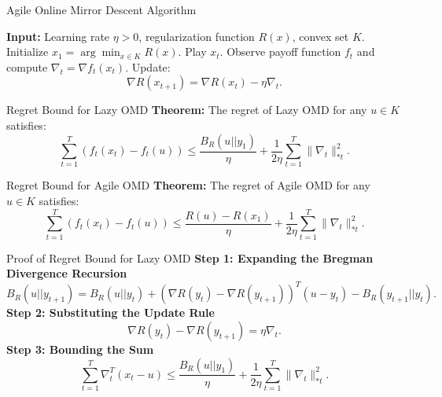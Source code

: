 \documentclass{beamer}
\begin{document}
\begin{frame}{Agile Online Mirror Descent Algorithm}
    \begin{algorithm}[H]
        \caption{Agile Online Mirror Descent}
        \begin{algorithmic}[1]
            \State \textbf{Input:} Learning rate $\eta > 0$, regularization function $R(x)$, convex set $K$.
            \State Initialize $x_1 = \arg\min_{x \in K} R(x)$.
                \State Play $x_t$.
                \State Observe payoff function $f_t$ and compute $\nabla_t = \nabla f_t(x_t)$.
                \State Update:
                \begin{equation}
                    \nabla R(x_{t+1}) = \nabla R(x_t) - \eta \nabla_t.
                \end{equation}
            \EndFor
        \end{algorithmic}
    \end{algorithm}
\end{frame}

\begin{frame}{Regret Bound for Lazy OMD}
    \textbf{Theorem:} The regret of Lazy OMD for any $u \in K$ satisfies:
    \begin{equation}
        \sum_{t=1}^{T} (f_t(x_t) - f_t(u)) \leq \frac{B_R(u || y_1)}{\eta} + \frac{1}{2\eta} \sum_{t=1}^{T} \| \nabla_t \|_{*t}^2.
    \end{equation}
\end{frame}

\begin{frame}{Regret Bound for Agile OMD}
    \textbf{Theorem:} The regret of Agile OMD for any $u \in K$ satisfies:
    \begin{equation}
        \sum_{t=1}^{T} (f_t(x_t) - f_t(u)) \leq \frac{R(u) - R(x_1)}{\eta} + \frac{1}{2\eta} \sum_{t=1}^{T} \| \nabla_t \|_{*t}^2.
    \end{equation}
\end{frame}

\begin{frame}{Proof of Regret Bound for Lazy OMD}
    \textbf{Step 1: Expanding the Bregman Divergence Recursion}
    \begin{equation}
        B_R(u || y_{t+1}) = B_R(u || y_t) + (\nabla R(y_t) - \nabla R(y_{t+1}))^T (u - y_t) - B_R(y_{t+1} || y_t).
    \end{equation}
    \textbf{Step 2: Substituting the Update Rule}
    \begin{equation}
        \nabla R(y_t) - \nabla R(y_{t+1}) = \eta \nabla_t.
    \end{equation}
    \textbf{Step 3: Bounding the Sum}
    \begin{equation}
        \sum_{t=1}^{T} \nabla_t^T (x_t - u) \leq \frac{B_R(u || y_1)}{\eta} + \frac{1}{2\eta} \sum_{t=1}^{T} \| \nabla_t \|_{*t}^2.
    \end{equation}
\end{frame}
\end{document}
